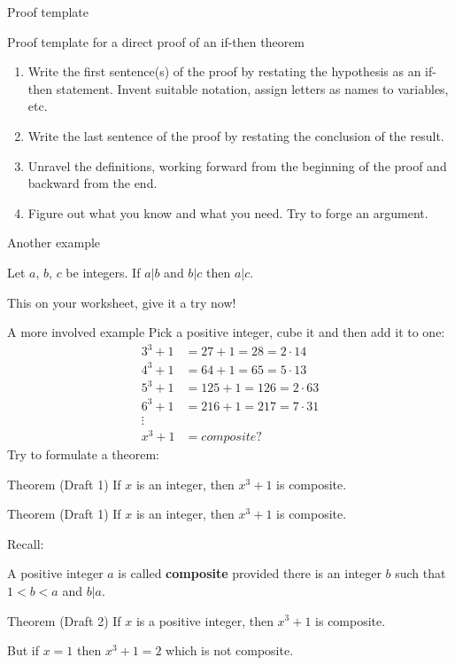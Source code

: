 \documentclass{beamer}
\begin{document}
\begin{frame}{Proof template}
\begin{block}{{Proof template for a direct proof of an if-then theorem}}
\begin{enumerate}
\item Write the first sentence(s) of the proof by restating the hypothesis as an if-then statement. Invent suitable notation, assign letters as names to variables, etc.\pause
\item Write the last sentence of the proof by restating the conclusion of the result.\pause
\item Unravel the definitions, working forward from the beginning of the proof and backward from the end.\pause
\item Figure out what you know and what you need. Try to forge an argument.
\end{enumerate}
\end{block}

\end{frame}

\begin{frame}{Another example}
\begin{theorem}
Let $a$, $b$, $c$ be integers. If $a|b$ and $b|c$ then $a|c$.
\end{theorem}\pause
This on your worksheet, give it a try now!
\end{frame}

\begin{frame}{A more involved example}
Pick a positive integer, cube it and then add it to one:
\begin{align*}
3^3+1&=27+1=28=2\cdot 14\\
4^3+1&=64+1=65=5\cdot 13\\
5^3+1&=125+1=126=2\cdot 63\\
6^3+1&=216+1=217=7\cdot 31\\
\vdots\\
x^3+1&= composite?
\end{align*}\pause
Try to formulate a theorem:
\begin{block}{Theorem (Draft 1)}
If $x$ is an integer, then $x^3+1$ is composite.
\end{block}\pause
{}
\end{frame}

\begin{frame}

\begin{block}{Theorem (Draft 1)}
If $x$ is an integer, then $x^3+1$ is composite.
\end{block}
Recall:
\begin{definition}
A \alert{positive} integer $a$ is called \textbf{composite} provided there is an integer $b$ such that $1<b<a$ and $b|a$.
\end{definition}\pause
{}\pause
\begin{block}{Theorem (Draft 2)}
If $x$ is a positive integer, then $x^3+1$ is composite.
\end{block}\pause
But if $x=1$ then $x^3+1=2$ which is not composite.
\end{frame}
\end{document}
